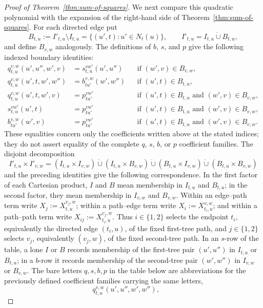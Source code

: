 \documentclass[pdflatex,sn-mathphys-num]{sn-jnl}
\theoremstyle{thmstyleone}
\begin{document}
\begin{proof}[Proof of Theorem~\ref{thm:sum-of-squares}]
We next compare this quadratic polynomial with the expansion of the
right-hand side of Theorem~\ref{thm:sum-of-squares}.  For each directed edge
put
\[
B_{t,u}:=I'_{t,u}\setminus I_{t,u}
=\{(u',t):u'\in N_t(u)\},
\qquad I'_{t,u}=I_{t,u}\mathbin{\dot\cup}B_{t,u},
\]
and define $B_{v,w}$ analogously.  The definitions of $b$, $s$, and $p$ give
the following indexed boundary identities:
\begin{equation*}
\begin{aligned}
q_{t,u}^{v,w}(u',u'',w',v)&=s_{t,u}^{vw'}(u',u'')
&&\text{if }(w',v)\in B_{v,w},\\
q_{t,u}^{v,w}(u',t,w',w'')&=b_{tu'}^{v,w}(w',w'')
&&\text{if }(u',t)\in B_{t,u},\\
q_{t,u}^{v,w}(u',t,w',v)&=p_{tu'}^{vw'}
&&\text{if }(u',t)\in B_{t,u}\text{ and }(w',v)\in B_{v,w},\\
s_{t,u}^{vw'}(u',t)&=p_{tu'}^{vw'}
&&\text{if }(u',t)\in B_{t,u}\text{ and }(w',v)\in B_{v,w},\\
b_{tu'}^{v,w}(w',v)&=p_{tu'}^{vw'}
&&\text{if }(u',t)\in B_{t,u}\text{ and }(w',v)\in B_{v,w}.
\end{aligned}
\end{equation*}
These equalities concern only the coefficients written above at the stated
indices; they do not assert equality of the complete $q$, $s$, $b$, or $p$
coefficient families.
The disjoint decomposition
\[
I'_{t,u}\times I'_{v,w}
=(I_{t,u}\times I_{v,w})
\mathbin{\dot\cup}(I_{t,u}\times B_{v,w})
\mathbin{\dot\cup}(B_{t,u}\times I_{v,w})
\mathbin{\dot\cup}(B_{t,u}\times B_{v,w})
\]
and the preceding identities give the following correspondence.  In the
first factor of each Cartesian product, $I$ and $B$ mean membership in
$I_{t,u}$ and $B_{t,u}$; in the second factor, they mean membership in
$I_{v,w}$ and $B_{v,w}$.
Within an edge--path term write $X_j:=X_{t,u}^{v_j,w}$; within a path--edge
term write $X_i:=X_{t_i,u}^{v,w}$; and within a path--path term write
$X_{ij}:=X_{t_i,u}^{v_j,w}$.  Thus $i\in\{1,2\}$ selects the endpoint
$t_i$, equivalently the directed edge $(t_i,u)$, of the fixed first-tree path,
and $j\in\{1,2\}$ selects $v_j$, equivalently $(v_j,w)$, of the fixed
second-tree path.  In an $s$-row of the table, a lone $I$ or $B$ records
membership of the first-tree pair $(u',u'')$ in $I_{t,u}$ or $B_{t,u}$; in a
$b$-row it records membership of the second-tree pair $(w',w'')$ in
$I_{v,w}$ or $B_{v,w}$.  The
bare letters $q,s,b,p$
in the table below are abbreviations for the previously defined coefficient
families carrying the same letters,
\[
q_{t,u}^{v,w}(u',u'',w',w''),\qquad
\]
\end{proof}
\end{document}
